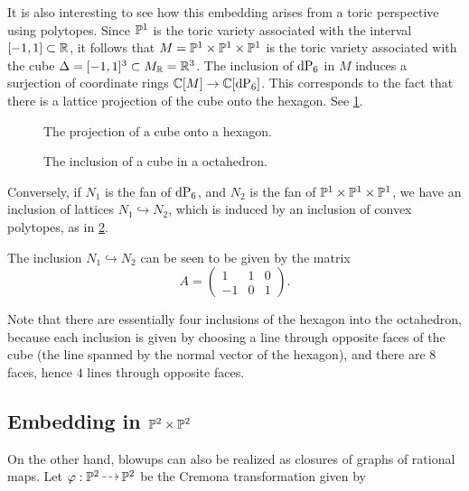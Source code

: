It is also interesting to see how this embedding arises from a toric perspective using polytopes. Since $\P^1$ is the toric variety associated with the interval $[-1,1] \subset \R$, it follows that $M = \P^1 \times \P^1 \times \P^1$ is the toric variety associated with the cube $\Delta = [-1,1]^3 \subset M_\R = \R^3$. The inclusion of $\dP6$ in $M$ induces a surjection of coordinate rings $\C[M] \to \C[\dP6]$. This corresponds to the fact that there is a lattice projection of the cube onto the hexagon. See \cref{fig:cube_projection}.

\begin{figure}[t]
\centering 

\caption{The projection of a cube onto a hexagon.}
\label{fig:cube_projection}
\end{figure}

 \begin{figure}
\centering 

\caption{The inclusion of a cube in a octahedron.}
\label{fig:octahedron_hexagon}
\end{figure}

Conversely, if $N_1$ is the fan of $\dP6$, and $N_2$ is the fan of $\P^1 \times \P^1 \times \P^1$, we have an inclusion of lattices $N_1 \hookrightarrow N_2$, which is induced by an inclusion of convex polytopes, as in \cref{fig:octahedron_hexagon}.


The inclusion $N_1 \hookrightarrow N_2$ can be seen to be given by the matrix
\begin{equation}
\label{eq:A}
A = 
\begin{pmatrix}
1 & 1 & 0 \\
-1 & 0 & 1
\end{pmatrix}.
\end{equation}

Note that there are essentially four inclusions of the hexagon into the octahedron, because each inclusion is given by choosing a line through opposite faces of the cube (the line spanned by the normal vector of the hexagon), and there are $8$ faces, hence $4$ lines through opposite faces.

\subsection{Embedding in $\P^2 \times \P^2$}
\label{sec:emb_p2p2}

On the other hand, blowups can also be realized as closures of graphs of rational maps. Let $\varphi: \P^2 \rmap \P^2$ be the Cremona transformation given by

